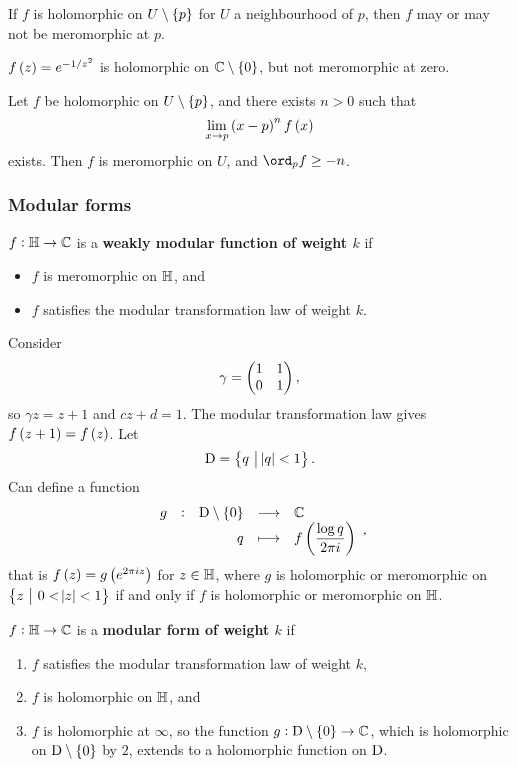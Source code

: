 If $ f $ is holomorphic on $ U \setminus \cbr{p} $ for $ U $ a neighbourhood of $ p $, then $ f $ may or may not be meromorphic at $ p $.

\begin{example*}
$ f\br{z} = e^{-1 / z^2} $ is holomorphic on $ \CC \setminus \cbr{0} $, but not meromorphic at zero.
\end{example*}

\begin{theorem}
Let $ f $ be holomorphic on $ U \setminus \cbr{p} $, and there exists $ n > 0 $ such that
$$ \lim_{x \to p} \br{x - p}^nf\br{x} $$
exists. Then $ f $ is meromorphic on $ U $, and $ \ord_p f \ge -n $.
\end{theorem}

\pagebreak

\subsubsection{Modular forms}

\begin{definition}
$ f : \mathbb{H} \to \mathbb{C} $ is a \textbf{weakly modular function of weight $ k $} if
\begin{itemize}
\item $ f $ is meromorphic on $ \mathbb{H} $, and
\item $ f $ satisfies the modular transformation law of weight $ k $.
\end{itemize}
\end{definition}

Consider
$$ \gamma = \begin{pmatrix} 1 & 1 \\ 0 & 1 \end{pmatrix}, $$
so $ \gamma z = z + 1 $ and $ cz + d = 1 $. The modular transformation law gives $ f\br{z + 1} = f\br{z} $. Let
$$ \D = \cbr{q \st \abs{q} < 1}. $$
Can define a function
$$ \function[g]{\D \setminus \cbr{0}}{\CC}{q}{f\br{\dfrac{\log q}{2\pi i}}}, $$
that is $ f\br{z} = g\br{e^{2\pi iz}} $ for $ z \in \mathbb{H} $, where $ g $ is holomorphic or meromorphic on $ \cbr{z \st 0 < \abs{z} < 1} $ if and only if $ f $ is holomorphic or meromorphic on $ \mathbb{H} $.

\begin{definition}
$ f : \mathbb{H} \to \mathbb{C} $ is a \textbf{modular form of weight $ k $} if
\begin{enumerate}
\item $ f $ satisfies the modular transformation law of weight $ k $,
\item $ f $ is holomorphic on $ \mathbb{H} $, and
\item $ f $ is holomorphic at $ \infty $, so the function $ g : \D \setminus \cbr{0} \to \CC $, which is holomorphic on $ \D \setminus \cbr{0} $ by $ 2 $, extends to a holomorphic function on $ \mathrm{D} $.
\end{enumerate}
\end{definition}

